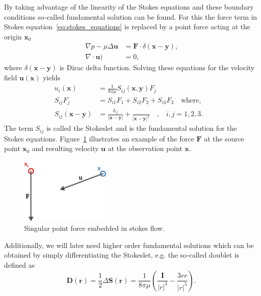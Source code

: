 \documentclass[a4paper,11pt]{kth-mag}
\begin{document}
By taking advantage of the linearity of the Stokes equations and these boundary conditions so-called fundamental solution can be found. For this the force term in Stokes equation~\eqref{eq:stokes_equations} is replaced by a point force acting at the origin $\mathbf{x}_0$
\begin{equation}
  \label{eq:stokes_equations_point}
  \begin{aligned}
    \nabla p - \mu \Delta \mathbf{u} &= \mathbf{F} \cdot \delta(\mathbf{x} - \mathbf{y}) \text{,} \\
    \nabla \cdot \mathbf{u}) &= 0\text{,}
  \end{aligned}
\end{equation}
where $\delta(\mathbf{x}-\mathbf{y})$ is Dirac delta function. Solving these equations for the velocity field $\mathbf{u}(\mathbf{x})$ yields
\begin{equation}
  \label{eq:stokeslet}
  \begin{aligned}
    u_i(\mathbf{x}) &= \frac{1}{8\pi\mu}S_{ij}(\mathbf{x},\mathbf{y})F_j \\
    S_{ij}F_j &= S_{i1}F_1 + S_{i2}F_2 + S_{i3}F_3 \quad \text{where,} \quad \\
    S_{ij}(\mathbf{x} - \mathbf{y}) &= \frac{\delta_{ij}}{|\mathbf{x}-\mathbf{y}|} + \frac{}{|\mathbf{x}-\mathbf{y}|^3}\quad \text{,} \quad i,j=1,2,3\text{.}
  \end{aligned}
\end{equation}
The term $S_{ij}$ is called the Stokeslet and is the fundamental solution for the Stokes equations. Figure~\ref{fig:stokeslet} illustrates an example of the force $\mathbf{F}$ at the source point $\mathbf{x}_0$ and resulting velocity $\mathbf{u}$ at the observation point $\mathbf{x}$.

\begin{figure}[!htbp]
  \centering
  \includegraphics[width=0.3819660112501450000000\textwidth]{img/stokeslet.pdf}
  \caption{Singular point force embedded in stokes flow.}
  \label{fig:stokeslet}
\end{figure}

Additionally, we will later need higher order fundamental solutions which can be obtained by simply differentiating the Stokeslet, e.g. the so-called doublet is defined as
\begin{equation}
  \label{eq:doublet}
  \mathbf{D}(\mathbf{r}) = \frac{1}{2} \Delta\mathbf{S}(\mathbf{r}) = \frac{1}{8\pi\mu} \left(\frac{\mathbf{I}}{|r|^3} - \frac{3rr}{|r|^5}\right) \text{.}
\end{equation}
\end{document}
